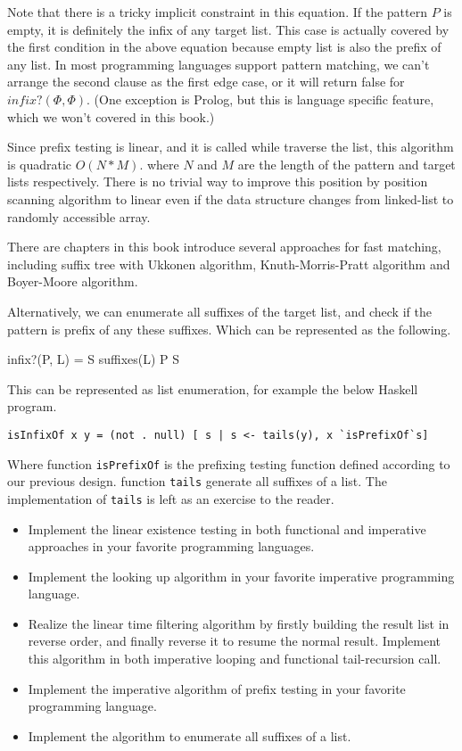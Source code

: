 \documentclass{article}
\begin{document}
Note that there is a tricky implicit constraint in this equation. If the pattern $P$ is empty,
it is definitely the infix of any target list. This case is actually covered by the first condition
in the above equation because empty list is also the prefix of any list. In most programming languages
support pattern matching, we can't arrange the second clause as the first edge case, or it will
return false for $infix?(\Phi, \Phi)$. (One exception is Prolog, but this is language specific 
feature, which we won't covered in this book.)

Since prefix testing is linear, and it is called while traverse the list, this algorithm 
is quadratic $O(N*M)$. where $N$ and $M$ are the length of the pattern and target lists respectively.
There is no trivial way to improve this position by position scanning algorithm to linear
even if the data structure changes from linked-list to randomly accessible array.

There are chapters in this book introduce several approaches for fast matching, including 
suffix tree with Ukkonen algorithm, Knuth-Morris-Pratt algorithm and Boyer-Moore algorithm.

Alternatively, we can enumerate all suffixes of the target list, and check if the pattern 
is prefix of any these suffixes. Which can be represented as the following.

\be
infix?(P, L) = \exists S \in suffixes(L) \land P \subseteq S
\ee

This can be represented as list enumeration, for example the below Haskell program.

\lstset{language=Haskell}
\begin{lstlisting}
isInfixOf x y = (not . null) [ s | s <- tails(y), x `isPrefixOf`s]
\end{lstlisting}

Where function \verb|isPrefixOf| is the prefixing testing function defined according to
our previous design. function \verb|tails| generate all suffixes of a list. The implementation
of \verb|tails| is left as an exercise to the reader.

\begin{Exercise}
\begin{itemize}
\item Implement the linear existence testing in both functional and imperative approaches in 
your favorite programming languages.
\item Implement the looking up algorithm in your favorite imperative programming language.
\item Realize the linear time filtering algorithm by firstly building the result list in reverse
order, and finally reverse it to resume the normal result. Implement this algorithm in both
imperative looping and functional tail-recursion call.
\item Implement the imperative algorithm of prefix testing in your favorite programming language.
\item Implement the algorithm to enumerate all suffixes of a list.
\end{itemize}
\end{Exercise}
\end{document}
